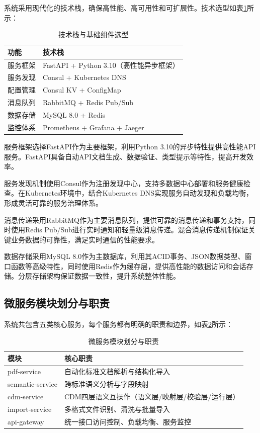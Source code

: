 系统采用现代化的技术栈，确保高性能、高可用性和可扩展性。技术选型如表\ref{table:tech_stack}所示：

\begin{table}[H]
    \caption{技术栈与基础组件选型}
    \label{table:tech_stack}
    \centering
    \begin{tabular}{|l|l|}
        \hline
        \textbf{功能} & \textbf{技术栈} \\
        \hline
        服务框架 & FastAPI + Python 3.10（高性能异步框架） \\
        服务发现 & Consul + Kubernetes DNS \\
        配置管理 & Consul KV + ConfigMap \\
        消息队列 & RabbitMQ + Redis Pub/Sub \\
        数据存储 & MySQL 8.0 + Redis \\
        监控体系 & Prometheus + Grafana + Jaeger \\
        \hline
    \end{tabular}
\end{table}

服务框架选择FastAPI作为主要框架，利用Python 3.10的异步特性提供高性能API服务。FastAPI具备自动API文档生成、数据验证、类型提示等特性，提高开发效率。

服务发现机制使用Consul作为注册发现中心，支持多数据中心部署和服务健康检查。在Kubernetes环境中，结合Kubernetes DNS实现服务自动发现和负载均衡，形成灵活可靠的服务治理体系。

消息传递采用RabbitMQ作为主要消息队列，提供可靠的消息传递和事务支持，同时使用Redis Pub/Sub进行实时通知和轻量级消息传递。混合消息传递机制保证关键业务数据的可靠性，满足实时通信的性能要求。

数据存储采用MySQL 8.0作为主数据库，利用其ACID事务、JSON数据类型、窗口函数等高级特性，同时使用Redis作为缓存层，提供高性能的数据访问和会话存储。分层存储架构保证数据一致性，提升系统整体性能。

\subsection{微服务模块划分与职责}

系统共包含五类核心服务，每个服务都有明确的职责和边界，如表\ref{table:microservices}所示：

\begin{table}[H]
    \caption{微服务模块划分与职责}
    \label{table:microservices}
    \centering
    \begin{tabular}{|l|l|}
        \hline
        \textbf{模块} & \textbf{核心职责} \\
        \hline
        pdf-service & 自动化标准文档解析与结构化导入 \\
        semantic-service & 跨标准语义分析与字段映射 \\
        cdm-service & CDM四层语义互操作（语义层/映射层/校验层/运行层） \\
        import-service & 多格式文件识别、清洗与批量导入 \\
        api-gateway & 统一接口访问控制、负载均衡、服务监控 \\
        \hline
    \end{tabular}
\end{table}

